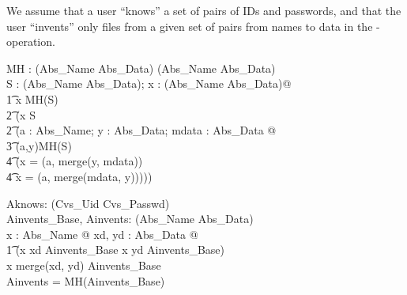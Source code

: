 We assume that a user ``knows'' a set of pairs of IDs and passwords, and that
the user ``invents'' only files from a given set of pairs from names to data in
the -operation.
%
%
%
%
\begin{axdef}
  MH : \power (Abs\_Name \cross Abs\_Data) 
  \fun \power (Abs\_Name \cross Abs\_Data)\\
  \where
    \forall S : \power (Abs\_Name \cross Abs\_Data); 
    x : (Abs\_Name \cross Abs\_Data)@\\ 
    \t1 x \in MH(S) \iff \\
    \t2 (x \in S \\
    \t2 \lor (\exists a : Abs\_Name; y : Abs\_Data; mdata : Abs\_Data @ \\
    \t3 (a,y)\in MH(S) \land \\
    \t4 (x = (a, merge(y, mdata))\\

    \t4 \lor x = (a, merge(mdata, y)))))\\
\end{axdef}
%
%
\begin{axdef}
  Aknows: \power (Cvs\_Uid \cross Cvs\_Passwd) \\
  Ainvents\_Base, Ainvents: \power (Abs\_Name \cross Abs\_Data)\\
    \where
    \forall x : Abs\_Name @ \forall xd, yd : Abs\_Data @ \\
    \t1 (x \mapsto xd \in Ainvents\_Base \land x \mapsto yd \in Ainvents\_Base)\\
    \iff  x \mapsto merge(xd, yd) \in Ainvents\_Base\\
    Ainvents = MH(Ainvents\_Base)\\
  \end{axdef}

